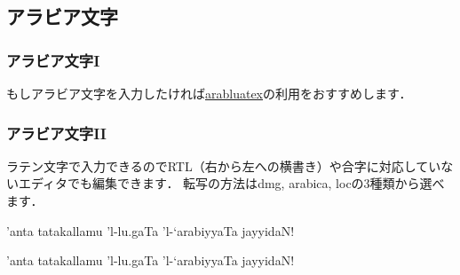 \documentclass[%
  hyperref={%
    colorlinks,
    linkcolor=sDarkBlue,
    urlcolor=sDarkBlue,
    citecolor=sDarkBlue
  },
  aspectratio=169
]{beamer}
\newcommand{\inlinecommand}[1]{{\ttfamily #1}}
\begin{document}
    \subsection{アラビア文字}
    \begin{frame}[fragile]
    \frametitle{アラビア文字I}
        もしアラビア文字を入力したければ\href{https://ctan.org/pkg/arabluatex?lang=en}{arabluatex}の利用をおすすめします．
    \begin{leftbar}
\begin{LaTeXCode}
\usepackage{arabluatex}
\newfontfamily{}
\newfontfamily{}
\SetTranslitFont{\translitfont}
\SetTranslitStyle{\itshape} %
{} %
\end{LaTeXCode}
    \end{leftbar}
    \end{frame}

    \begin{frame}[fragile]
        \frametitle{アラビア文字II}
        ラテン文字で入力できるのでRTL（右から左への横書き）や合字に対応していないエディタでも編集できます．
        転写の方法は\inlinecommand{dmg}, \inlinecommand{arabica}, \inlinecommand{loc}の3種類から選べます．

        \begin{leftbar}
\begin{LaTeXCode}
\begin{arab}[fullvoc]
    'anta tatakallamu 'l-lu.gaTa
    'l-`arabiyyaTa jayyidaN!
\end{arab}
\end{LaTeXCode}
        \end{leftbar}

        \begin{arab}[fullvoc]
            'anta tatakallamu 'l-lu.gaTa 'l-`arabiyyaTa jayyidaN!
        \end{arab}

        \bigskip

    \end{frame}
\end{document}
